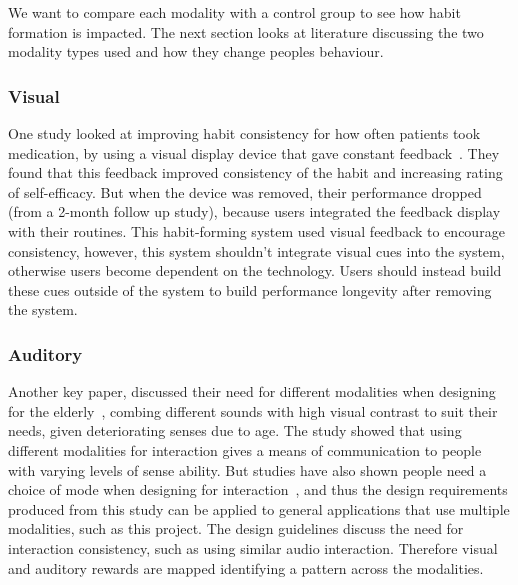 \documentclass{scaffold/sigchi}
\begin{document}
We want to compare each modality with a control group to see how habit formation is impacted. The next section looks at literature discussing the two modality types used and how they change peoples behaviour.
\subsubsection{Visual}
One study looked at improving habit consistency for how often patients took medication,
by using a visual display device that gave constant feedback~\cite{article_realtime_feedback_improving_medication_taking}.
They found that this feedback improved consistency of the habit and increasing rating of self-efficacy.
But when the device was removed, their performance dropped (from a 2-month follow up study), because users integrated the feedback display with their routines.
This habit-forming system used visual feedback to encourage consistency, however, this system shouldn't integrate visual cues into the system, otherwise users become dependent on the technology.
Users should instead build these cues outside of the system to build performance longevity after removing the system.
\subsubsection{Auditory}
Another key paper, discussed their need for different modalities when designing for the elderly~\cite{article_movipill_improving_medication_elders},
combing different sounds with high visual contrast to suit their needs, given deteriorating senses due to age.
The study showed that using different modalities for interaction gives a means of communication to people with varying levels of sense ability.
But studies have also shown people need a choice of mode when designing for interaction~\cite{article_user_centred_multimodal_reminders},
and thus the design requirements produced from this study can be applied to general applications that use multiple modalities, such as this project.
The design guidelines discuss the need for interaction consistency, such as using similar audio interaction.
Therefore visual and auditory rewards are mapped identifying a pattern across the modalities.
\end{document}
